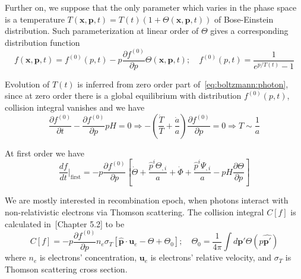 \documentclass[12pt]{extarticle}
\numberwithin{problem}{section}
\numberwithin{theorem}{section}
\begin{document}
	Further on, we suppose that the only parameter which varies in the phase space is a temperature $T(\mathbf{x}, \mathbf{p}, t) = T(t)(1 + \Theta(\mathbf{x}, \mathbf{p}, t))$ of Bose-Einstein distribution. Such parameterization at linear order of $\Theta$ gives a corresponding distribution function
	\begin{equation}
		f(\mathbf{x}, \mathbf{p}, t) = f^{(0)}(p, t) - p\frac{\partial f^{(0)}}{\partial p}\Theta(\mathbf{x}, \mathbf{p}, t);\quad f^{(0)}(p, t) = \frac{1}{e^{p / T(t)} - 1}
	\end{equation} 

	Evolution of $T(t)$ is inferred from zero order part of~\ref{eq:boltzmann:photon}, since at zero order there is a global equilibrium with distribution $f^{(0)}(p, t)$, collision integral vanishes and we have
	\begin{equation}
		\frac{\partial f^{(0)}}{\partial t} - \frac{\partial f^{(0)}}{\partial p}pH = 0\Rightarrow -\left(\frac{\dot{T}}{T} + \frac{\dot{a}}{a}\right)\frac{\partial f^{(0)}}{\partial p} = 0\Rightarrow T\sim\frac{1}{a}
	\end{equation}

	At first order we have
	\begin{equation}
		\label{eq:boltzmann:photon-first}
		\frac{df}{dt}\Big\lvert_{\text{first}} = -p\frac{\partial f^{(0)}}{\partial p}\left[\dot{\Theta} + \frac{\hat{p}^i\Theta_{,i}}{a} + \dot{\Phi} + \frac{\hat{p}^i\Psi_{,i}}{a} - pH\frac{\partial\Theta}{\partial p}\right]
	\end{equation}

	We are mostly interested in recombination epoch, when photons interact with non-relativistic electrons via Thomson scattering. The collision integral $C[f]$ is calculated in~\cite{dodelson:2003}[Chapter 5.2] to be
	\begin{equation}
		\label{eq:collision:photon}
		C[f] = -p\frac{\partial f^{(0)}}{\partial p}n_e\sigma_T\left[\mathbf{\hat{p}}\cdot\mathbf{u}_e - \Theta + \Theta_0\right];\quad \Theta_0 = \frac{1}{4\pi}\int d\mathbf{\hat{p'}}\Theta(p\mathbf{\hat{p'}})
	\end{equation}
	where $n_e$ is electrons' concentration, $\mathbf{u}_e$ is electrons' relative velocity, and $\sigma_T$ is Thomson scattering cross section.
\end{document}
